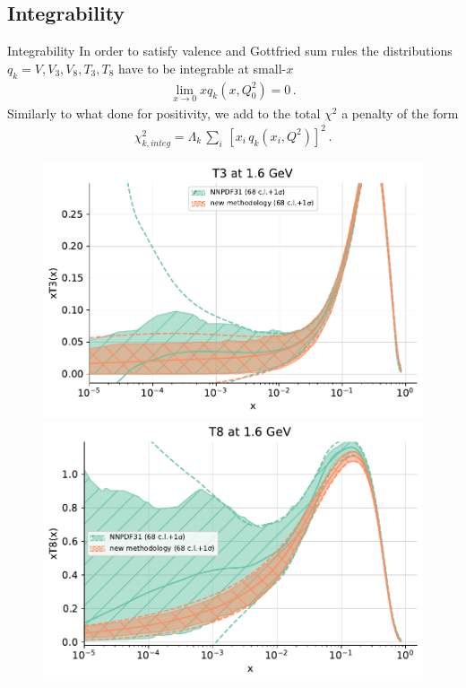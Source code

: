 \subsection{Integrability}
\begin{frame}{Integrability}
	In order to satisfy valence and Gottfried sum rules the distributions $ q_k =V, V_3, V_8, T_3, T_8$ have to be integrable at small-$x$
	\begin{align*}
		\lim_{x\rightarrow 0} xq_k\left(x,Q_0^2\right) = 0\,.%
	\end{align*}
	Similarly to what done for positivity, we add to the total $\chi^2$ a penalty of the form
	\begin{align*}
		\chi^2_{k,integ} = \Lambda_k \,\sum_i \,\left[x_i\,q_k\left(x_i,Q^2\right)\right]^2\,.
	\end{align*}


	\begin{figure}[h!]
		\includegraphics[scale=0.32]{pos_integ/plot_pdfs_T3_integ.pdf}
		\includegraphics[scale=0.32]{pos_integ/plot_pdfs_T8_integ.pdf}
	\end{figure}

\end{frame}

